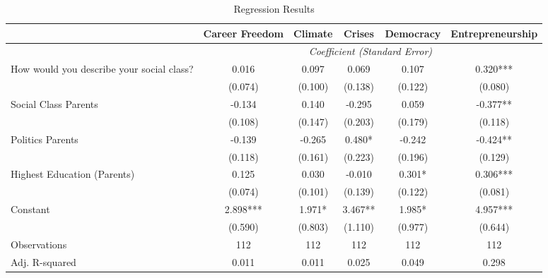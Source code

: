 \documentclass{article}
\begin{document}
 
\begin{landscape} 
\begin{table}[htbp]
    \centering
    \renewcommand{\arraystretch}{1.2} %
     \LARGE
    \setlength{\tabcolsep}{10pt} %
    \footnotesize %
    \begin{tabular}{lccccc}
        \toprule
        & \textbf{Career Freedom} & \textbf{Climate} & \textbf{Crises} & \textbf{Democracy} & \textbf{Entrepreneurship} \\
        \midrule
        & \multicolumn{5}{c}{\textit{Coefficient (Standard Error)}} \\
        \midrule
        How would you describe your social class? & 0.016 & 0.097 & 0.069 & 0.107 & 0.320*** \\
                                                 & (0.074) & (0.100) & (0.138) & (0.122) & (0.080) \\
        Social Class Parents                     & -0.134 & 0.140 & -0.295 & 0.059 & -0.377** \\
                                                 & (0.108) & (0.147) & (0.203) & (0.179) & (0.118) \\
        Politics Parents                         & -0.139 & -0.265 & 0.480* & -0.242 & -0.424** \\
                                                 & (0.118) & (0.161) & (0.223) & (0.196) & (0.129) \\
        Highest Education (Parents)              & 0.125 & 0.030 & -0.010 & 0.301* & 0.306*** \\
                                                 & (0.074) & (0.101) & (0.139) & (0.122) & (0.081) \\
        \midrule
        Constant                                 & 2.898*** & 1.971* & 3.467** & 1.985* & 4.957*** \\
                                                 & (0.590) & (0.803) & (1.110) & (0.977) & (0.644) \\
        \midrule
        Observations                             & 112 & 112 & 112 & 112 & 112 \\
        Adj. R-squared                           & 0.011 & 0.011 & 0.025 & 0.049 & 0.298 \\
        \bottomrule
    \end{tabular}
    \caption{Regression Results}
    \label{tab:regression_results}
\end{table}
\end{landscape} 
\end{document}
